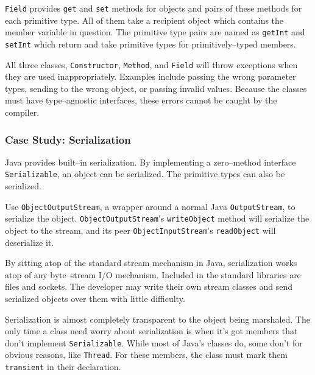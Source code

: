 \texttt{Field} provides \texttt{get} and \texttt{set} methods for objects and
pairs of these methods for each primitive type. All of them take a recipient
object which contains the member variable in question. The primitive type
pairs are named as \texttt{getInt} and \texttt{setInt} which return and take
primitive types for primitively--typed members.

All three classes, \texttt{Constructor}, \texttt{Method}, and \texttt{Field}
will throw exceptions when they are used inappropriately. Examples include
passing the wrong parameter types, sending to the wrong object, or passing
invalid values. Because the classes must have type--agnostic interfaces, these
errors cannot be caught by the compiler.


\subsubsection{Case Study: Serialization}

Java provides built--in serialization\cite{957325,944589,376846}. By
implementing a zero--method interface \texttt{Serializable}, an object can be
serialized. The primitive types can also be serialized.

Use \texttt{Obj\-ect\-Outp\-utStr\-eam}\cite{java-api}, a wrapper around a
normal Java \texttt{Out\-p\-ut\-Str\-eam}, to serialize the object.
\texttt{Obj\-ect\-Outp\-utStr\-eam}'s \texttt{writeObject} method will
serialize the object to the stream, and its peer
\texttt{Obj\-ect\-Inp\-utStr\-eam}'s \texttt{readObject} will deserialize it.

By sitting atop of the standard stream mechanism in Java, serialization works
atop of any byte--stream I/O mechanism. Included in the standard libraries are
files and sockets. The developer may write their own stream classes and send
serialized objects over them with little difficulty.

Serialization is almost completely transparent to the object being marshaled.
The only time a class need worry about serialization is when it's got members
that don't implement \texttt{Serializable}. While most of Java's classes do,
some don't for obvious reasons, like \texttt{Thread}. For these members, the
class must mark them \texttt{transient} in their declaration.

